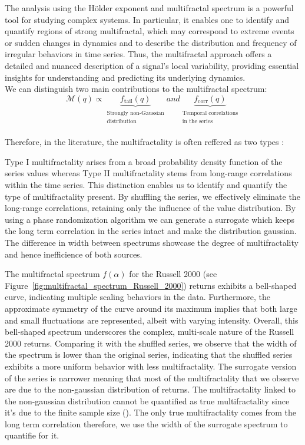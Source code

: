 \documentclass[11pt]{extarticle}
\begin{document}
The analysis using the Hölder exponent and multifractal spectrum is a powerful tool for studying complex systems.
In particular, it enables one to identify and quantify regions of strong multifractal, which may correspond to extreme
events or sudden changes in dynamics and to describe the distribution and frequency of irregular behaviors in time series.
Thus, the multifractal approach offers a detailed and nuanced description of a signal's local variability, providing
essential insights for understanding and predicting its underlying dynamics. \\

We can distinguish two main contributions to the multifractal spectrum:
\[
\mathcal{M}(q) \propto
\underbrace{f_{\text{tail}}(q)}_{\substack{\text{Strongly non-Gaussian} \\ \text{distribution}}}
and
\underbrace{f_{\text{corr}}(q)}_{\substack{\text{Temporal correlations} \\ \text{in the series}}}
\]
\\

Therefore, in the literature, the multifractality is often reffered as two types :

Type I multifractality arises from a broad probability density function of the series values \cite{kantelhardt2002} whereas Type II
multifractality stems from long-range correlations within the time series. This distinction enables us to identify and quantify
the type of multifractality present. By shuffling the series, we effectively eliminate the long-range correlations,
retaining only the influence of the value distribution. By using a phase randomization algorithm we can generate a surrogate which keeps the long term correlation in the series intact
and make the distribution gaussian.
The difference in width between spectrums showcase the degree of multifractality and hence inefficience of both sources.\\

\label{sec:multifractal_spectrum}

The multifractal spectrum $f(\alpha)$ for the Russell 2000 (see Figure~\ref{fig:multifractal_spectrum_Russell_2000}) returns exhibits a bell-shaped curve,
indicating multiple scaling behaviors in the data. Furthermore,
the approximate symmetry of the curve around its maximum implies that both large and small fluctuations are represented,
albeit with varying intensity. Overall, this bell-shaped spectrum underscores the complex, multi-scale nature of the
Russell 2000 returns.
Comparing it with the shuffled series, we observe that the width of the spectrum is lower than the original series, indicating that the
shuffled series exhibits a more uniform behavior with less multifractality. The surrogate version of the series is narrower
meaning that most of the multifractality that we observe are due to the non-gaussian distribution of returns. The multifractality linked to
the non-gaussian distribution cannot be quantified as true multifractality since it's due to the finite sample size (\cite{kwapien2023}).
The only true multifractality comes from the long term correlation therefore, we use the width of the surrogate spectrum to quantifie for it.
\end{document}
